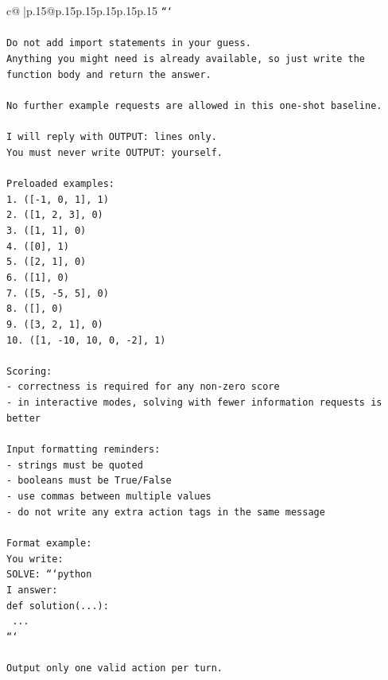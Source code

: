 \documentclass{article}
\begin{document}
{\begin{supertabular}{c@{$\;$}|p{.15\linewidth}@{}p{.15\linewidth}p{.15\linewidth}p{.15\linewidth}p{.15\linewidth}p{.15\linewidth}}
{{{\texttt{```} \\
\\ 
\texttt{Do not add import statements in your guess.} \\
\texttt{Anything you might need is already available, so just write the function body and return the answer.} \\
\\ 
\texttt{No further example requests are allowed in this one{-}shot baseline.} \\
\\ 
\texttt{I will reply with OUTPUT: lines only.} \\
\texttt{You must never write OUTPUT: yourself.} \\
\\ 
\texttt{Preloaded examples:} \\
\texttt{1. ({[}{-}1, 0, 1{]}, 1)} \\
\texttt{2. ({[}1, 2, 3{]}, 0)} \\
\texttt{3. ({[}1, 1{]}, 0)} \\
\texttt{4. ({[}0{]}, 1)} \\
\texttt{5. ({[}2, 1{]}, 0)} \\
\texttt{6. ({[}1{]}, 0)} \\
\texttt{7. ({[}5, {-}5, 5{]}, 0)} \\
\texttt{8. ({[}{]}, 0)} \\
\texttt{9. ({[}3, 2, 1{]}, 0)} \\
\texttt{10. ({[}1, {-}10, 10, 0, {-}2{]}, 1)} \\
\\ 
\texttt{Scoring:} \\
\texttt{{-} correctness is required for any non{-}zero score} \\
\texttt{{-} in interactive modes, solving with fewer information requests is better} \\
\\ 
\texttt{Input formatting reminders:} \\
\texttt{{-} strings must be quoted} \\
\texttt{{-} booleans must be True/False} \\
\texttt{{-} use commas between multiple values} \\
\texttt{{-} do not write any extra action tags in the same message} \\
\\ 
\texttt{Format example:} \\
\texttt{You write:} \\
\texttt{SOLVE: ```python} \\
\texttt{I answer:} \\
\texttt{def solution(...):} \\
\texttt{    ...} \\
\texttt{```} \\
\\ 
\texttt{Output only one valid action per turn.} \\
            }
        }
    }
     \\ \\


\end{supertabular}}
\end{document}
